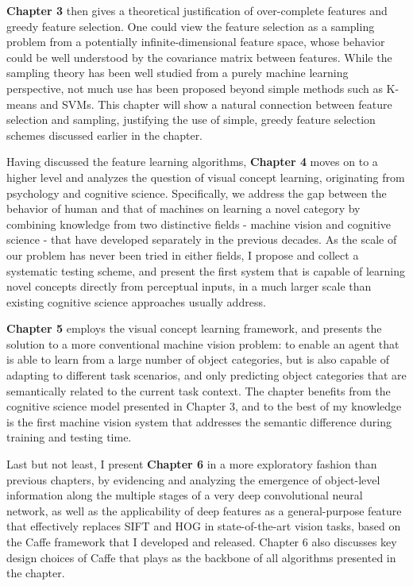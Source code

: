 {\bfseries Chapter 3} then gives a theoretical justification of over-complete features and greedy feature selection. One could view the feature selection as a sampling problem from a potentially infinite-dimensional feature space, whose behavior could be well understood by the covariance matrix between features. While the \nystrom sampling theory has been well studied from a purely machine learning perspective, not much use has been proposed beyond simple methods such as K-means and SVMs. This chapter will show a natural connection between feature selection and \nystrom sampling, justifying the use of simple, greedy feature selection schemes discussed earlier in the chapter.

Having discussed the feature learning algorithms, {\bfseries Chapter 4} moves on to a higher level and analyzes the question of visual concept learning, originating from psychology and cognitive science. Specifically, we address the gap between the behavior of human and that of machines on learning a novel category by combining knowledge from two distinctive fields - machine vision and cognitive science - that have developed separately in the previous decades. As the scale of our problem has never been tried in either fields, I propose and collect a systematic testing scheme, and present the first system that is capable of learning novel concepts directly from perceptual inputs, in a much larger scale than existing cognitive science approaches usually address.

{\bfseries Chapter 5} employs the visual concept learning framework, and presents the solution to a more conventional machine vision problem: to enable an agent that is able to learn from a large number of object categories, but is also capable of adapting to different task scenarios, and only predicting object categories that are semantically related to the current task context. The chapter benefits from the cognitive science model presented in Chapter 3, and to the best of my knowledge is the first machine vision system that addresses the semantic difference during training and testing time.

Last but not least, I present {\bfseries Chapter 6} in a more exploratory fashion than previous chapters, by evidencing and analyzing the emergence of object-level information along the multiple stages of a very deep convolutional neural network, as well as the applicability of deep features as a general-purpose feature that effectively replaces SIFT and HOG in state-of-the-art vision tasks, based on the Caffe framework that I developed and released. Chapter 6 also discusses key design choices of Caffe that plays as the backbone of all algorithms presented in the chapter.


